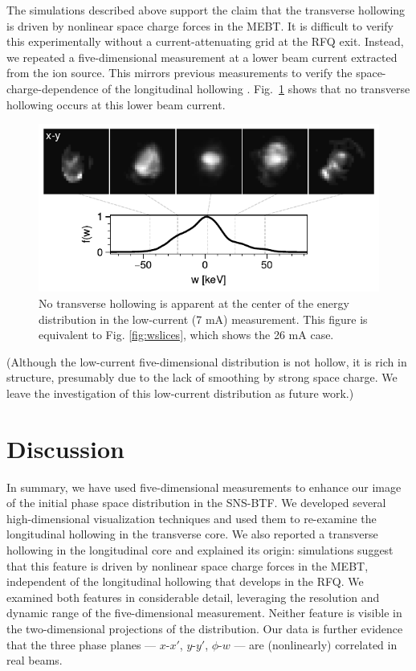 \documentclass[%
 reprint,
 amsmath,amssymb,
 aps,
prstab,
]{revtex4-2}
\begin{document}
The simulations described above support the claim that the transverse hollowing is driven by nonlinear space charge forces in the MEBT. It is difficult to verify this experimentally without a current-attenuating grid at the RFQ exit. Instead, we repeated a five-dimensional measurement at a lower beam current extracted from the ion source. This mirrors previous measurements to verify the space-charge-dependence of the longitudinal hollowing \cite{Cathey2018}. Fig.~\ref{fig:wslices_low_current} shows that no transverse hollowing occurs at this lower beam current.
%
\begin{figure}
    \centering
    \includegraphics[width=\columnwidth]{fig_xyw_7mA.pdf}
    \caption{No transverse hollowing is apparent at the center of the energy distribution in the low-current (7 mA) measurement. This figure is equivalent to Fig. \ref{fig:wslices}, which shows the 26 mA case.}
    \label{fig:wslices_low_current}
\end{figure}
%
(Although the low-current five-dimensional distribution is not hollow, it is rich in structure, presumably due to the lack of smoothing by strong space charge. We leave the investigation of this low-current distribution as future work.)


\section{Discussion}\label{sec:discussion}

In summary, we have used five-dimensional measurements to enhance our image of the initial phase space distribution in the SNS-BTF. We developed several high-dimensional visualization techniques and used them to re-examine the longitudinal hollowing in the transverse core. We also reported a transverse hollowing in the longitudinal core and explained its origin: simulations suggest that this feature is driven by nonlinear space charge forces in the MEBT, independent of the longitudinal hollowing that develops in the RFQ. We examined both features in considerable detail, leveraging the resolution and dynamic range of the five-dimensional measurement. Neither feature is visible in the two-dimensional projections of the distribution. Our data is further evidence that the three phase planes --- $x$-$x'$, $y$-$y'$, $\phi$-$w$ --- are (nonlinearly) correlated in real beams.
\end{document}
